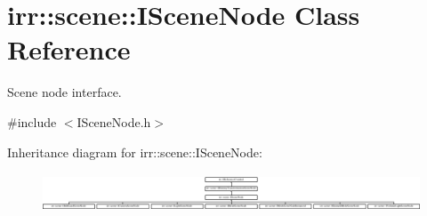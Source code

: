 \hypertarget{classirr_1_1scene_1_1ISceneNode}{}\section{irr\+:\+:scene\+:\+:I\+Scene\+Node Class Reference}
\label{classirr_1_1scene_1_1ISceneNode}


Scene node interface.  




{\ttfamily \#include $<$I\+Scene\+Node.\+h$>$}

Inheritance diagram for irr\+:\+:scene\+:\+:I\+Scene\+Node\+:\begin{figure}[H]
\begin{center}
\leavevmode
\includegraphics[height=1.172161cm]{classirr_1_1scene_1_1ISceneNode}
\end{center}
\end{figure}
